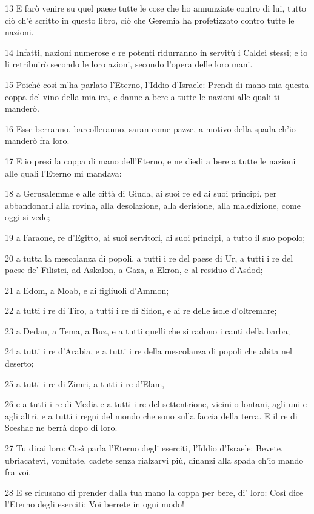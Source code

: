 \par 13 E farò venire su quel paese tutte le cose che ho annunziate contro di lui, tutto ciò ch'è scritto in questo libro, ciò che Geremia ha profetizzato contro tutte le nazioni.
\par 14 Infatti, nazioni numerose e re potenti ridurranno in servitù i Caldei stessi; e io li retribuirò secondo le loro azioni, secondo l'opera delle loro mani.
\par 15 Poiché così m'ha parlato l'Eterno, l'Iddio d'Israele: Prendi di mano mia questa coppa del vino della mia ira, e danne a bere a tutte le nazioni alle quali ti manderò.
\par 16 Esse berranno, barcolleranno, saran come pazze, a motivo della spada ch'io manderò fra loro.
\par 17 E io presi la coppa di mano dell'Eterno, e ne diedi a bere a tutte le nazioni alle quali l'Eterno mi mandava:
\par 18 a Gerusalemme e alle città di Giuda, ai suoi re ed ai suoi principi, per abbandonarli alla rovina, alla desolazione, alla derisione, alla maledizione, come oggi si vede;
\par 19 a Faraone, re d'Egitto, ai suoi servitori, ai suoi principi, a tutto il suo popolo;
\par 20 a tutta la mescolanza di popoli, a tutti i re del paese di Ur, a tutti i re del paese de' Filistei, ad Askalon, a Gaza, a Ekron, e al residuo d'Asdod;
\par 21 a Edom, a Moab, e ai figliuoli d'Ammon;
\par 22 a tutti i re di Tiro, a tutti i re di Sidon, e ai re delle isole d'oltremare;
\par 23 a Dedan, a Tema, a Buz, e a tutti quelli che si radono i canti della barba;
\par 24 a tutti i re d'Arabia, e a tutti i re della mescolanza di popoli che abita nel deserto;
\par 25 a tutti i re di Zimri, a tutti i re d'Elam,
\par 26 e a tutti i re di Media e a tutti i re del settentrione, vicini o lontani, agli uni e agli altri, e a tutti i regni del mondo che sono sulla faccia della terra. E il re di Sceshac ne berrà dopo di loro.
\par 27 Tu dirai loro: Così parla l'Eterno degli eserciti, l'Iddio d'Israele: Bevete, ubriacatevi, vomitate, cadete senza rialzarvi più, dinanzi alla spada ch'io mando fra voi.
\par 28 E se ricusano di prender dalla tua mano la coppa per bere, di' loro: Così dice l'Eterno degli eserciti: Voi berrete in ogni modo!
